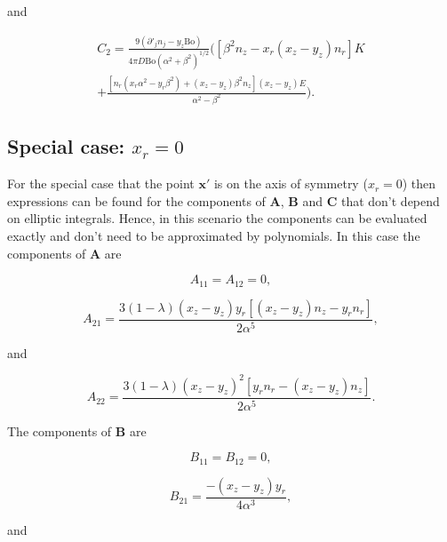 \documentclass[12pt]{article}
\begin{document}
and 

\begin{align}
\label{equ:C2_comp}
C_{2} = \frac{9 (\partial'_{j} n_{j} - y_{z} \text{Bo})}{4 \pi D \text{Bo} (\alpha^{2} + \beta^{2})^{1/2}}  \bigg( [\beta^{2} n_{z} - x_{r} (x_{z} - y_{z}) n_{r}] K \nonumber \\
+ \frac{[n_{r} (x_{r} \alpha^{2} - y_{r} \beta^{2}) + (x_{z} - y_{z}) \beta^{2} n_{z}] (x_{z} - y_{z}) E}{\alpha^{2} - \beta^{2}}\bigg).
\end{align}

\subsection{Special case: $x_{r} = 0$}
\label{subapp:spec_case}

For the special case that the point $\boldsymbol{x'}$ is on the axis of symmetry ($x_{r} = 0$) then expressions can be found for the components of $\boldsymbol{A}$, $\boldsymbol{B}$ and $\boldsymbol{C}$ that don't depend on elliptic integrals. Hence, in this scenario the components can be evaluated exactly and don't need to be approximated by polynomials. In this case the components of $\boldsymbol{A}$ are

\begin{equation}
\label{equ:A11_spec}
A_{11} = A_{12} = 0,
\end{equation}

\begin{equation}
\label{equ:A21_spec}
A_{21} = \frac{3 (1 - \lambda) (x_{z} - y_{z}) y_{r} [(x_{z} - y_{z}) n_{z} - y_{r} n_{r}]}{2 \alpha^{5}},
\end{equation}

and

\begin{equation}
\label{equ:A22_spec}
A_{22} = \frac{3 (1 - \lambda) (x_{z} - y_{z})^{2} [y_{r} n_{r} - (x_{z} - y_{z}) n_{z}]}{2 \alpha^{5}}.
\end{equation}

The components of $\boldsymbol{B}$ are

\begin{equation}
\label{equ:B11_spec}
B_{11} = B_{12} = 0,
\end{equation}

\begin{equation}
\label{equ:B21_spec}
B_{21} = \frac{-(x_{z} - y_{z}) y_{r}}{4 \alpha^{3}},
\end{equation}

and
\end{document}
